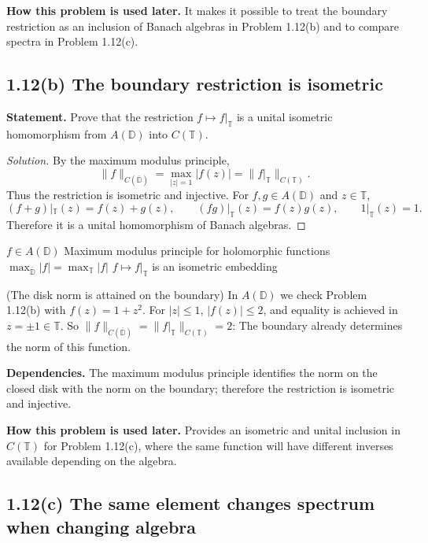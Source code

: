 \noindent\textbf{How this problem is used later.} It makes it possible to treat the boundary restriction as an inclusion of Banach algebras in Problem 1.12(b) and to compare spectra in Problem 1.12(c).

\subsection*{1.12(b) The boundary restriction is isometric}

\noindent\textbf{Statement.} Prove that the restriction $f\mapsto f|_{\mathbb T}$ is a unital isometric homomorphism from $A(\mathbb D)$ into $C(\mathbb T)$.

\begin{proof}[Solution]
By the maximum modulus principle,
\[
 \|f\|_{C(\overline{\mathbb D})}=\max_{|z|=1}|f(z)|=\|f|_{\mathbb T}\|_{C(\mathbb T)}.
\]
Thus the restriction is isometric and injective. For $f,g\in A(\mathbb D)$ and $z\in\mathbb T$,
\[
 (f+g)|_{\mathbb T}(z)=f(z)+g(z),\qquad
 (fg)|_{\mathbb T}(z)=f(z)g(z),\qquad
 1|_{\mathbb T}(z)=1.
\]
Therefore it is a unital homomorphism of Banach algebras.
\end{proof}

\proofdiagram
{$f\in A(\mathbb D)$}
{Maximum modulus principle for holomorphic functions}
{$\max_{\overline{\mathbb D}}|f|=\max_{\mathbb T}|f|$}
{$f\mapsto f|_{\mathbb T}$ is an isometric embedding}

\begin{cthejemplo}{(The disk norm is attained on the boundary)}
In $A(\mathbb D)$ we check Problem 1.12(b) with $f(z)=1+z^2$.
For $|z|\le1$, $|f(z)|\le2$, and equality is achieved in $z=\pm1\in\mathbb T$.
So $\|f\|_{C(\overline{\mathbb D})}=\|f|_{\mathbb T}\|_{C(\mathbb T)}=2$:
The boundary already determines the norm of this function.
\end{cthejemplo}

\noindent\textbf{Dependencies.} The maximum modulus principle identifies the norm on the closed disk with the norm on the boundary; therefore the restriction is isometric and injective.

\noindent\textbf{How this problem is used later.} Provides an isometric and unital inclusion in $C(\mathbb T)$ for Problem 1.12(c), where the same function will have different inverses available depending on the algebra.

\subsection*{1.12(c) The same element changes spectrum when changing algebra}

